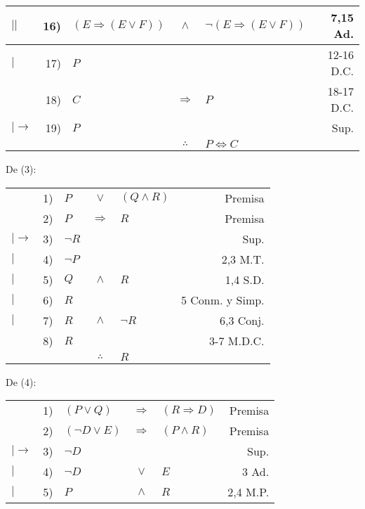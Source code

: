\documentclass[12pt]{report}
\theoremstyle{largebreak}
\begin{document}
\begin{sol}
\begin{center}
\begin{tabular}{l r l c l r}
                $||$ & 16) & $(E\Rightarrow(E\lor F))$ & $\land$ & $\neg(E\Rightarrow(E\lor F))$ & 7,15 Ad.\\
                \hline
                $|$ & 17) & $P$ &  &  & 12-16 D.C. \\
                \hline
                 & 18) & $C$ & $\Rightarrow$ & $P$ & 18-17 D.C. \\
                $|\longrightarrow$ & 19) & $P$ &  &  & Sup. \\
                & & & $\therefore$ & $P\iff C$ & \\
            \end{tabular}
        \end{center}
        De (3):
        \begin{center}
            \begin{tabular}{l r l c l r}
                & 1) & $P$ & $\lor$ & $(Q\land R)$ & Premisa \\
                & 2) & $P$ & $\Rightarrow$ & $R$ & Premisa \\
                $|\longrightarrow$& 3) & $\neg R$ &  &  & Sup. \\
                $|$& 4) & $\neg P$ &  &  & 2,3 M.T. \\
                $|$& 5) & $Q$ & $\land$ & $R$ & 1,4 S.D. \\
                $|$& 6) & $R$ &  &  & 5 Conm. y Simp. \\
                $|$& 7) & $R$ & $\land$ & $\neg R$ & 6,3 Conj. \\
                \hline
                & 8) & $R$ &  &  & 3-7 M.D.C. \\
                \hline
                & & & $\therefore$ & $R$ & \\
            \end{tabular}
        \end{center}
        De (4):
        \begin{center}
            \begin{tabular}{l r l c l r}
                & 1) & $(P\lor Q)$ & $\Rightarrow$ & $(R\Rightarrow D)$ & Premisa \\
                & 2) & $(\neg D\lor E)$ & $\Rightarrow$ & $(P\land R)$ & Premisa \\
                $|\longrightarrow$ & 3) & $\neg D$ &  &  & Sup. \\
                $|$ & 4) & $\neg D$ & $\lor$ & $E$ & 3 Ad. \\
                $|$ & 5) & $P$ & $\land$ & $R$ & 2,4 M.P. \\

\end{tabular}
\end{center}
\end{sol}
\end{document}
